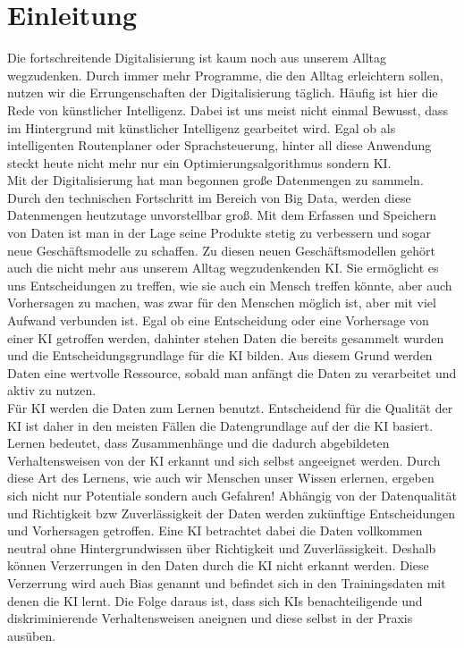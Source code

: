 \chapter{Einleitung}
    \begin{onehalfspace}    
        \label{sec:einleitung}
        Die fortschreitende Digitalisierung ist kaum noch aus unserem Alltag wegzudenken. Durch immer mehr Programme, die den Alltag erleichtern sollen, nutzen wir die Errungenschaften der Digitalisierung täglich. Häufig ist hier die Rede von künstlicher Intelligenz. Dabei ist uns meist nicht einmal Bewusst, dass im Hintergrund mit künstlicher Intelligenz gearbeitet wird. Egal ob als intelligenten Routenplaner oder Sprachsteuerung, hinter all diese Anwendung steckt heute nicht mehr nur ein Optimierungsalgorithmus sondern \ac{KI}. 
        \\
        Mit der Digitalisierung hat man begonnen große Datenmengen zu sammeln. Durch den technischen Fortschritt im Bereich von Big Data, werden diese Datenmengen heutzutage unvorstellbar groß. Mit dem Erfassen und Speichern von Daten ist man in der Lage seine Produkte stetig zu verbessern und sogar neue Geschäftsmodelle zu schaffen. Zu diesen neuen Geschäftsmodellen gehört auch die nicht mehr aus unserem Alltag wegzudenkenden \ac{KI}. Sie ermöglicht es uns Entscheidungen zu treffen, wie sie auch ein Mensch treffen könnte, aber auch Vorhersagen zu machen, was zwar für den Menschen möglich ist, aber mit viel Aufwand verbunden ist. Egal ob eine Entscheidung oder eine Vorhersage von einer \ac{KI} getroffen werden, dahinter stehen Daten die bereits gesammelt wurden und die Entscheidungsgrundlage für die \ac*{KI} bilden. Aus diesem Grund werden Daten eine wertvolle Ressource, sobald man anfängt die Daten zu verarbeitet und aktiv zu nutzen. 
        \\
        Für \ac*{KI} werden die Daten zum Lernen benutzt. Entscheidend für die Qualität der \ac*{KI} ist daher in den meisten Fällen die Datengrundlage auf der die \ac*{KI} basiert. Lernen bedeutet, dass Zusammenhänge und die dadurch abgebildeten Verhaltensweisen von der \ac*{KI} erkannt und sich selbst angeeignet werden. Durch diese Art des Lernens, wie auch wir Menschen unser Wissen erlernen, ergeben sich nicht nur Potentiale sondern auch Gefahren! Abhängig von der Datenqualität und Richtigkeit \ac*{bzw} Zuverlässigkeit der Daten werden zukünftige Entscheidungen und Vorhersagen getroffen. Eine \ac*{KI} betrachtet dabei die Daten vollkommen neutral ohne Hintergrundwissen über Richtigkeit und Zuverlässigkeit. Deshalb können Verzerrungen in den Daten durch die \ac*{KI} nicht erkannt werden. Diese Verzerrung wird auch Bias genannt und befindet sich in den Trainingsdaten mit denen die \ac*{KI} lernt. Die Folge daraus ist, dass sich \ac*{KI}s benachteiligende und diskriminierende Verhaltensweisen aneignen und diese selbst in der Praxis ausüben.

\end{onehalfspace}
